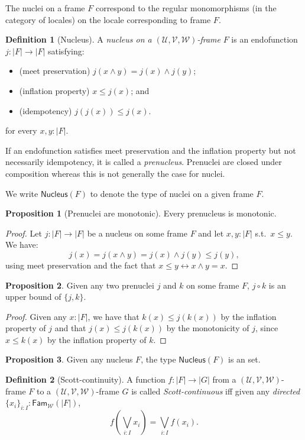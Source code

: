 \documentclass[a4paper, 11pt]{article}
\theoremstyle{definition}
\newtheorem{prop}{Proposition}
\newtheorem{defn}{Definition}
\newcommand{\UU}{\mathcal{U}}
\newcommand{\VV}{\mathcal{V}}
\newcommand{\WW}{\mathcal{W}}
\newcommand{\Fam}[2]{\mathsf{Fam}_{#1}\left(#2\right)}
\newcommand{\define}[1]{\emph{#1}}
\begin{document}
The nuclei on a frame $F$ correspond to the regular monomorphisms (in the category of locales) on
the locale corresponding to frame $F$.

\begin{defn}[Nucleus]
  A \define{nucleus on a $(\UU, \VV, \WW)$-frame} $F$ is an endofunction $j : | F | \rightarrow | F |$
  satisfying:
  \begin{itemize}
    \item (meet preservation) $j(x \wedge y) = j(x) \wedge j(y)$;
    \item (inflation property) $x \le j(x)$; and
    \item (idempotency) $j(j(x)) \le j(x)$.
  \end{itemize}
  for every $x, y : | F |$.
\end{defn}

If an endofunction satisfies meet preservation and the inflation property but not necessarily
idempotency, it is called a \define{prenucleus}. Prenuclei are closed under composition whereas this
is not generally the case for nuclei.

We write $\mathsf{Nucleus}(F)$ to denote the type of nuclei on a given frame $F$.

\begin{prop}[Prenuclei are monotonic]\label{prop:nuclei-mono}
  Every prenucleus is monotonic.
\end{prop}
\begin{proof}
  Let $j : | F | \rightarrow | F |$ be a nucleus on some frame $F$ and let $x, y : | F |$
  s.t.\ $x \le y$.
  We have:
  \begin{equation*}
    j(x) = j (x \wedge y) = j(x) \wedge j(y) \le j(y),
  \end{equation*}
  using meet preservation and the fact that $x \le y \leftrightarrow x \wedge y = x$.
\end{proof}

\begin{prop}\label{prop:nucl-lemma-1}
  Given any two prenuclei $j$ and $k$ on some frame $F$, $j \circ k$ is an upper bound of $\{ j, k \}$.
\end{prop}
\begin{proof}
  Given any $x : | F |$, we have that $k(x) \le j(k(x))$ by the inflation property of $j$ and that
  $j(x) \le j(k(x))$ by the monotonicity of $j$, since $x \le k(x)$ by the inflation property of $k$.
\end{proof}

\begin{prop}
  Given any nucleus $F$, the type $\mathsf{Nucleus}(F)$ is an set.
\end{prop}
\begin{defn}[Scott-continuity]
  A function $f : | F | \rightarrow | G | $ from a $(\UU, \VV, \WW)$-frame $F$ to a $(\UU, \VV, \WW)$-frame
  $G$ is called \define{Scott-continuous} iff given any \emph{directed}
  $\{ x_i \}_{i : I} : \Fam{\WW}{| F |}$,
  \begin{equation*}
    f\left(\bigvee_{i : I} x_i\right) = \bigvee_{i : I} f(x_i).
  \end{equation*}
\end{defn}
\end{document}

